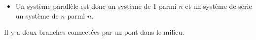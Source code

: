 \documentclass[french]{article}
\begin{document}
\begin{multicols*}{2}
\begin{definitionNOHFILL}
\begin{itemize}
	\item	Un système parallèle est donc un système de $1$ parmi $n$ et un système de série un système de $n$ parmi $n$.
\end{itemize}
\end{definitionNOHFILL}

\begin{definitionNOHFILL}
Il y a deux branches connectées par un pont dans le milieu.
\begin{center}
\begin{tikzpicture}[x=0.75pt,y=0.75pt,yscale=-1,xscale=1]


\end{tikzpicture}
\end{center}
\end{definitionNOHFILL}
\end{multicols*}
\end{document}
